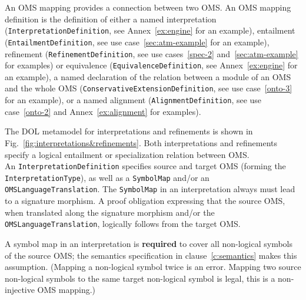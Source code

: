 \documentclass[10pt, a4paper]{isov2}
\newcommand*{\termref}[1]{\index{#1}#1\xspace}
\newcommand*{\syntax}[1]{\texttt{#1}}
\newcommand*{\required}{\textbf{required}\xspace}
\renewcommand{\clauserefname}{clause}
\renewcommand{\cref}[1]{\clauserefname~\ref{#1}}
\begin{document}
\label{c:oms-mappings}




An OMS mapping provides a connection between two OMS. An OMS mapping
definition is the definition of either a named interpretation
(\syntax{InterpretationDefinition}, see Annex~\ref{ex:engine} for an example), entailment (\syntax{EntailmentDefinition}, see use case~\ref{sec:atm-example} for an example),
refinement (\syntax{RefinementDefinition}, see use cases~\ref{spec-2} and~\ref{sec:atm-example} for examples) or equivalence
(\syntax{EquivalenceDefinition}, see Annex~\ref{ex:engine} for an example), a named declaration of the relation
between a module of an OMS and the whole OMS
(\syntax{ConservativeExtensionDefinition}, see use case~\ref{onto-3} for an example), or a named \termref{alignment}
(\syntax{AlignmentDefinition}, see use case~\ref{onto-2} and Annex~\ref{ex:alignment} for examples).


The DOL metamodel for  interpretations and refinements is shown in 
Fig.~\ref{fig:interpretations&refinements}.
Both interpretations and refinements specify a logical entailment or
specialization relation between OMS.\\
 An
\syntax{InterpretationDefinition} specifies source and target OMS
(forming the \syntax{InterpretationType}), as well as a
\syntax{SymbolMap} and/or an \syntax{OMSLanguageTranslation}.  The
\syntax{SymbolMap} in an interpretation always must lead to a
signature morphism. A proof obligation expressing that the source OMS,
when translated along the signature morphism and/or the
\syntax{OMSLanguageTranslation}, logically follows from the target OMS.

A symbol map in an interpretation is \required to cover all
non-logical symbols of the source OMS; the semantics specification in
\cref{c:semantics} makes this assumption. ({Mapping a non-logical
  symbol twice is an error. Mapping two source non-logical symbols to
  the same target non-logical symbol is legal, this is a non-injective
  OMS mapping.})
\end{document}
